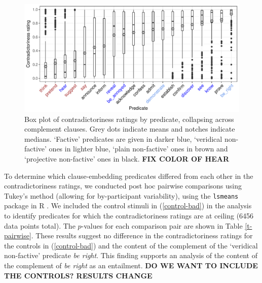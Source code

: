 \documentclass[11pt,fleqn]{article}
\newcommand{\6}{\mbox{$[\hspace*{-.6mm}[$}}
\newcommand{\9}{\mbox{$]\hspace*{-.6mm}]$}}
\begin{document}
{%

\begin{figure}[h!]
\centering

\includegraphics[width=.75\paperwidth]{../results/2-veridicality2/graphs/boxplot-veridicality}

\caption{Box plot of contradictoriness ratings by predicate, collapsing across complement clauses. Grey dots indicate means and notches indicate medians. `Factive' predicates are given in darker blue, `veridical non-factive' ones in lighter blue, `plain non-factive' ones in brown and `projective non-factive' ones in black. {\bf FIX COLOR OF HEAR}}
\label{f-veridicality-predicate}
\end{figure}

To determine which clause-embedding predicates differed from each other in the contradictoriness ratings, we conducted post hoc pairwise comparisons using Tukey's method (allowing for by-participant variability), using the \verb|lsmeans| package \citep{tukey} in R \citep{r}. We included the control stimuli in (\ref{control-bad}) in the analysis to identify predicates for which the contradictoriness ratings are at ceiling (6456 data points total). The $p$-values for each comparison pair are shown in Table  \ref{t-pairwise}. These results suggest no difference in the contradictoriness ratings for the controls in (\ref{control-bad}) and the content of the complement of the `veridical non-factive' predicate {\em be right}. This finding supports an analysis of the content of the complement of {\em be right} as an entailment. {\bf DO WE WANT TO INCLUDE THE CONTROLS? RESULTS CHANGE}


}
\end{document}
